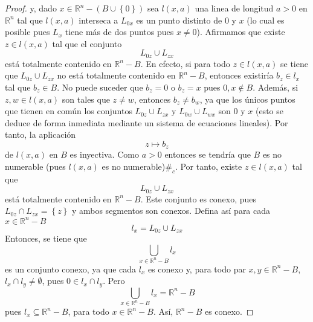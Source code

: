 \documentclass[12pt]{report}
\theoremstyle{largebreak}
\newcommand\contradiction{\ensuremath{\#_c}}
\begin{document}
\begin{proof}
        y, dado $x\in\mathbb{R}^n-(B\cup\left\{0\right\})$ sea $l(x,a)$ una linea de longitud $a>0$ en $\mathbb{R}^n$ tal que $l(x,a)$ interseca a $L_{0x}$ es un punto distinto de $0$ y $x$ (lo cual es posible pues $L_x$ tiene más de dos puntos pues $x\neq0$). Afirmamos que existe $z\in l(x,a)$ tal que el conjunto
        \begin{equation*}
            L_{0z}\cup L_{zx}
        \end{equation*}
        está totalmente contenido en $\mathbb{R}^n-B$. En efecto, si para todo $z\in l(x,a)$ se tiene que $L_{0z}\cup L_{zx}$ no está totalmente contenido en $\mathbb{R}^n-B$, entonces existiría $b_z\in l_x$ tal que $b_z\in B$. No puede suceder que $b_z=0$ o $b_z=x$ pues $0,x\notin B$. Además, si $z,w\in l(x,a)$ son tales que $z\neq w$, entonces $b_z\neq b_w$, ya que los únicos puntos que tienen en común los conjuntos $L_{0z}\cup L_{zx}$ y $L_{0w}\cup L_{wx}$ son $0$ y $x$ (esto se deduce de forma inmediata mediante un sistema de ecuaciones lineales). Por tanto, la aplicación
        \begin{equation*}
            z\mapsto b_z
        \end{equation*}
        de $l(x,a)$ en $B$ es inyectiva. Como $a>0$ entonces se tendría que $B$ es no numerable (pues $l(x,a)$ es no numerable)\contradiction. Por tanto, existe $z\in l(x,a)$ tal que
        \begin{equation*}
            L_{ 0z}\cup L_{zx}
        \end{equation*}
        está totalmente contenido en $\mathbb{R}^n-B$. Este conjunto es conexo, pues $L_{ 0z}\cap L_{zx}=\left\{z\right\}$ y ambos segmentos son conexos. Defina así para cada $x\in\mathbb{R}^n-B$
        \begin{equation*}
            l_x=L_{ 0z}\cup L_{zx}
        \end{equation*}
        Entonces, se tiene que
        \begin{equation*}
            \bigcup_{x\in\mathbb{R}^n-B}l_x
        \end{equation*}
        es un conjunto conexo, ya que cada $l_x$ es conexo y, para todo par $x,y\in\mathbb{R}^n-B$, $l_x\cap l_y\neq\emptyset$, pues $0\in l_x\cap l_y$. Pero
        \begin{equation*}
            \bigcup_{x\in\mathbb{R}^n-B}l_x=\mathbb{R}^n-B
        \end{equation*}
        pues $l_x\subseteq\mathbb{R}^n-B$, para todo $x\in\mathbb{R}^n-B$. Así, $\mathbb{R}^n-B$ es conexo.
    \end{proof}
\end{document}
